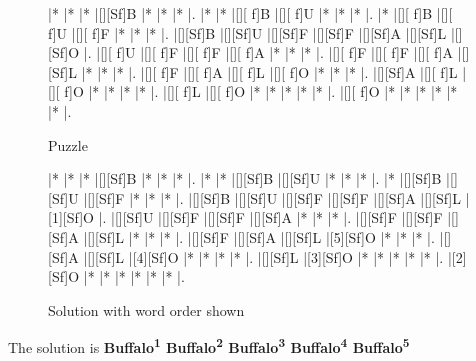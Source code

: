 \documentclass[letterpaper]{article}
\begin{document}
\vspace*{1em}
\begin{figure}[H]
\begin{minipage}{0.4\textwidth}
    \centering
    \begin{Puzzle}{7}{11}
        |*        |*        |*        |[][Sf]B  |*        |*        |*        |.
        |*        |*        |[][ f]B  |[][ f]U  |*        |*        |*        |.
        |*        |[][ f]B  |[][ f]U  |[][ f]F  |*        |*        |*        |.
        |[][Sf]B  |[][Sf]U  |[][Sf]F  |[][Sf]F  |[][Sf]A  |[][Sf]L  |[][Sf]O  |.
        |[][ f]U  |[][ f]F  |[][ f]F  |[][ f]A  |*        |*        |*        |.
        |[][ f]F  |[][ f]F  |[][ f]A  |[][Sf]L  |*        |*        |*        |.
        |[][ f]F  |[][ f]A  |[][ f]L  |[][ f]O  |*        |*        |*        |.
        |[][Sf]A  |[][ f]L  |[][ f]O  |*        |*        |*        |*        |.
        |[][ f]L  |[][ f]O  |*        |*        |*        |*        |*        |.
        |[][ f]O  |*        |*        |*        |*        |*        |*        |.
        \end{Puzzle}
    \caption*{Puzzle}
\end{minipage}
\hfill
\begin{minipage}{0.4\textwidth}
    \centering
    \begin{Puzzle}{7}{11}
        |*        |*        |*        |[][Sf]B  |*        |*        |*        |.
        |*        |*        |[][Sf]B  |[][Sf]U  |*        |*        |*        |.
        |*        |[][Sf]B  |[][Sf]U  |[][Sf]F  |*        |*        |*        |.
        |[][Sf]B  |[][Sf]U  |[][Sf]F  |[][Sf]F  |[][Sf]A  |[][Sf]L  |[1][Sf]O |.
        |[][Sf]U  |[][Sf]F  |[][Sf]F  |[][Sf]A  |*        |*        |*        |.
        |[][Sf]F  |[][Sf]F  |[][Sf]A  |[][Sf]L  |*        |*        |*        |.
        |[][Sf]F  |[][Sf]A  |[][Sf]L  |[5][Sf]O |*        |*        |*        |.
        |[][Sf]A  |[][Sf]L  |[4][Sf]O |*        |*        |*        |*        |.
        |[][Sf]L  |[3][Sf]O |*        |*        |*        |*        |*        |.
        |[2][Sf]O |*        |*        |*        |*        |*        |*        |.
        \end{Puzzle}
    \caption*{Solution with word order shown}
\end{minipage}
\end{figure}

The solution is \textbf{Buffalo\textsuperscript{1} Buffalo\textsuperscript{2} Buffalo\textsuperscript{3} Buffalo\textsuperscript{4} Buffalo\textsuperscript{5}}
\end{document}
